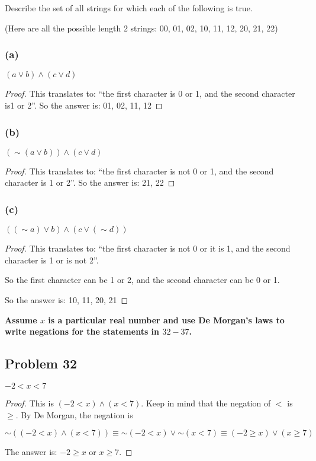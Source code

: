 \documentclass[14pt]{extarticle}
\begin{document}
Describe the set of all strings for which each of the following is true.

(Here are all the possible length 2 strings: 00, 01, 02, 10, 11, 12, 20, 21, 22)
\subsubsection{(a)}
$(a \vee b) \wedge (c \vee d)$

\begin{proof}
This translates to: ``the first character is 0 or 1, and the second character
is1 or 2''. So the answer is: 01, 02, 11, 12
\end{proof}

\subsubsection{(b)}
$({\sim(a \vee b)}) \wedge (c \vee d)$

\begin{proof}
This translates to: ``the first character is not 0 or 1, and the second
character is 1 or 2''. So the answer is: 21, 22
\end{proof}

\subsubsection{(c)}
$(({\sim a}) \vee b) \wedge (c \vee ({\sim d}))$

\begin{proof}
This translates to: ``the first character is not 0 or it is 1, and the second
character is 1 or is not 2''.

So the first character can be 1 or 2, and the second character can be 0 or 1.

So the answer is: 10, 11, 20, 21
\end{proof}

{\bf Assume $x$ is a particular real number and use De Morgan’s laws to write
negations for the statements in $32-37$.}

\subsection{Problem 32}
$-2 < x < 7$

\begin{proof}
This is $(-2 < x) \wedge (x < 7)$. Keep in mind that the negation of $<$ is
$\geq$. By De Morgan, the negation is

$\sim((-2 < x) \wedge (x < 7)) \equiv {\sim(-2 < x)} \vee {\sim(x < 7)} \equiv
(-2 \geq x) \vee (x \geq 7)$

The answer is: $-2 \geq x$ or $x \geq 7$.
\end{proof}
\end{document}

